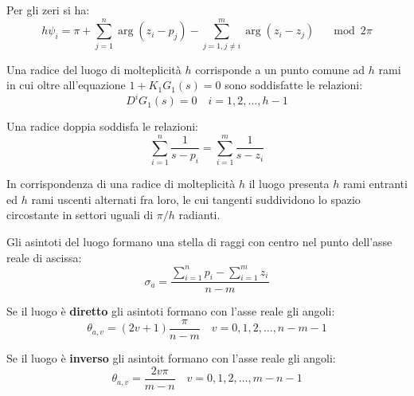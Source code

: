 Per gli zeri si ha:
\begin{equation}
  h \psi_i = \pi + \sum_{j=1}^n \arg (z_i - p_j) - \sum_{j=1, j\neq i}^m \arg (z_i - z_j) \quad \mod 2\pi
\end{equation}



\begin{definition}[Proprietà 5]
  Una radice del luogo di molteplicità $h$ corrisponde a un punto comune ad 
  $h$ rami in cui oltre all'equazione $1 + K_1G_1(s) = 0$ sono soddisfatte
  le relazioni:
  \begin{equation}
    D^i G_1(s) = 0 \quad i = 1,2,\dots,h-1
  \end{equation}
\end{definition}



\begin{definition}[Corollario]
  Una radice doppia soddisfa le relazioni:
  \begin{equation}
    \sum_{i=1}^n \frac{1}{s-p_i} = \sum_{i=1}^m \frac{1}{s-z_i}
  \end{equation}
\end{definition}

\begin{definition}[Proprietà 6]
  In corrispondenza di una radice di molteplicità $h$ il luogo presenta $h$
  rami entranti ed $h$ rami uscenti alternati fra loro, le cui tangenti suddividono
  lo spazio circostante in settori uguali di $\pi/h$ radianti.
\end{definition}



\begin{definition}[Proprietà 7]
  Gli asintoti del luogo formano una stella di raggi con centro nel punto dell'asse
  reale di ascissa:
  \begin{equation}
    \sigma_a = \frac{\sum_{i=1}^n p_i - \sum_{i=1}^m z_i}{n-m}
  \end{equation}

  Se il luogo è \textbf{diretto} gli asintoti formano con l'asse reale gli angoli:
  \begin{equation}
    \theta_{a, v} = (2v+1)\frac{\pi}{n-m} \quad v = 0,1,2,\dots,n-m-1
  \end{equation}

  Se il luogo è \textbf{inverso} gli asintoit formano con l'asse reale gli angoli:
  \begin{equation}
    \theta_{a, v} = \frac{2v\pi}{m-n} \quad v = 0,1,2,\dots,m-n-1
  \end{equation}
\end{definition}


